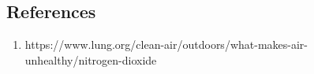 \documentclass[a4paper, 10pt]{article}
\begin{document}
\begin{flushleft}
   \section*{References}
      \begin{enumerate}
         \item https://www.lung.org/clean-air/outdoors/what-makes-air-unhealthy/nitrogen-dioxide
      \end{enumerate}
   
   \end{flushleft}
\end{document}
